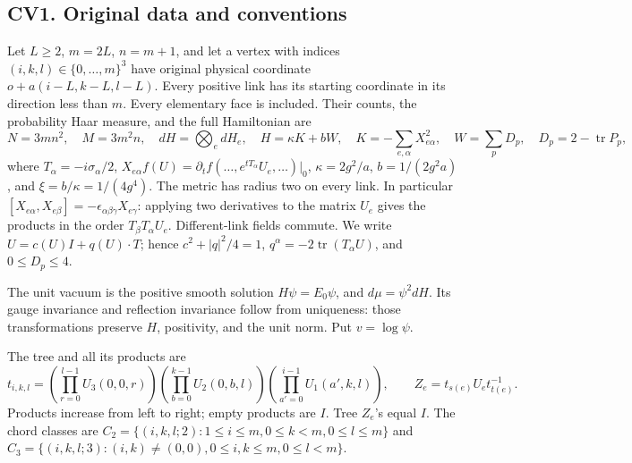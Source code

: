 \documentclass[11pt]{article}
\begin{document}
\subsection*{CV1. Original data and conventions}

Let \(L\ge2\), \(m=2L\), \(n=m+1\), and let a vertex with indices
\((i,k,l)\in\{0,\ldots,m\}^3\) have original physical coordinate
\(o+a(i-L,k-L,l-L)\). Every positive link has its starting coordinate in
its direction less than \(m\). Every elementary face is included. Their
counts, the probability Haar measure, and the full Hamiltonian are
\[
 N=3mn^2,\quad M=3m^2n,\quad dH=\bigotimes_e dH_e,
 \quad H=\kappa K+bW,
 \quad K=-\sum_{e,\alpha}X_{e\alpha}^2,
 \quad W=\sum_pD_p,
 \quad D_p=2-\operatorname{tr}P_p,                         \tag{CV1}
\]
where \(T_\alpha=-i\sigma_\alpha/2\),
\(X_{e\alpha}f(U)=\partial_t f(\ldots,e^{tT_\alpha}U_e,\ldots)|_0\),
\(\kappa=2g^2/a\), \(b=1/(2g^2a)\), and \(\xi=b/\kappa=1/(4g^4)\).
The metric has radius two on every link. In particular
\([X_{e\alpha},X_{e\beta}]=-\epsilon_{\alpha\beta\gamma}X_{e\gamma}\):
applying two derivatives to the matrix \(U_e\) gives the products in
the order \(T_\beta T_\alpha U_e\). Different-link fields commute.
We write \(U=c(U)I+q(U)\cdot T\); hence
\(c^2+|q|^2/4=1\), \(q^\alpha=-2\operatorname{tr}(T_\alpha U)\),
and \(0\le D_p\le4\).

The unit vacuum is the positive smooth solution
\(H\psi=E_0\psi\), and \(d\mu=\psi^2dH\). Its gauge invariance and
reflection invariance follow from uniqueness: those transformations
preserve \(H\), positivity, and the unit norm. Put \(v=\log\psi\).

The tree and all its products are
\[
 t_{i,k,l}=
 \left(\prod_{r=0}^{l-1}U_3(0,0,r)\right)
 \left(\prod_{b=0}^{k-1}U_2(0,b,l)\right)
 \left(\prod_{a'=0}^{i-1}U_1(a',k,l)\right),
 \qquad Z_e=t_{s(e)}U_et_{t(e)}^{-1}.                    \tag{CV2}
\]
Products increase from left to right; empty products are \(I\).
Tree \(Z_e\)'s equal \(I\). The chord classes are
\(C_2=\{(i,k,l;2):1\le i\le m,0\le k<m,0\le l\le m\}\) and
\(C_3=\{(i,k,l;3):(i,k)\ne(0,0),0\le i,k\le m,0\le l<m\}\).
\end{document}
